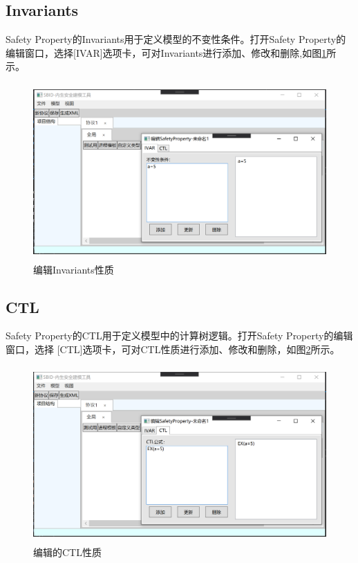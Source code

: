 \subsection{Invariants}
\par
Safety Property的Invariants用于定义模型的不变性条件。打开Safety Property的编辑窗口，选择[IVAR]选项卡，可对Invariants进行添加、修改和删除,如图\ref{safety_edit_invariants}所示。
\begin{figure}[h]
	\centering
	\includegraphics[width=12cm,height=6.75cm]{imgs/safety_edit_invariants.png}
	\caption{编辑Invariants性质}
	\label{safety_edit_invariants}
\end{figure}
\subsection{CTL}
\par
Safety Property的CTL用于定义模型中的计算树逻辑。打开Safety Property的编辑窗口，选择 [CTL]选项卡，可对CTL性质进行添加、修改和删除，如图\ref{safety_edit_CTL}所示。
\begin{figure}[h]
	\centering
	\includegraphics[width=12cm,height=6.75cm]{imgs/safety_edit_CTL.png}
	\caption{编辑的CTL性质}
	\label{safety_edit_CTL}
\end{figure}

